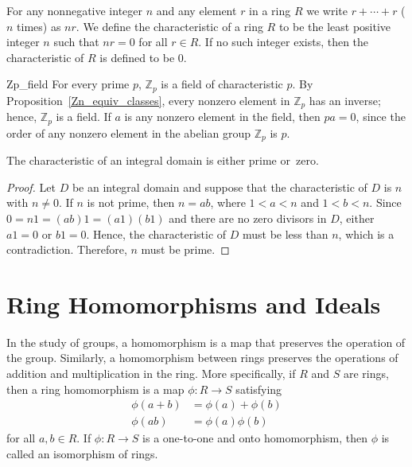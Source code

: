  
\medskip
 
 
For any nonnegative integer $n$ and any element $r$ in a ring $R$ we 
write $r + \cdots + r$ ($n$ times) as $nr$. We  define the {\bfi
characteristic\/}\label{ringchar} of a ring $R$ to 
be the least positive integer $n$ such that $nr=0$ for all $r \in R$.
If no such integer exists, then the characteristic of $R$ is defined
to be 0.  
 
 
\begin{example}{Zp_field}
For every prime $p$, ${\mathbb Z}_p$ is a field of characteristic $p$. By
Proposition~\ref{Zn_equiv_classes}, every nonzero element in ${\mathbb Z}_p$ has an inverse;
hence, ${\mathbb Z}_p$ is a field. If $a$ is any nonzero element in the
field, then $pa =0$, since the order of any nonzero element in the
abelian group ${\mathbb Z}_p$ is $p$. 
\end{example}
 
 
\begin{theorem}\label{rings:characteristic_theorem}
The characteristic of an integral domain is either prime or~zero.
\end{theorem}
 
 
\begin{proof}
Let $D$ be an integral domain and suppose that the characteristic of
$D$ is $n$ with $n \neq 0$. If $n$ is not prime, then $n = ab$, where
$1 < a <n$ and $1 < b < n$. Since $0 = n 1 = (ab)1 = (a1)(b1)$ and
there are no zero divisors in $D$, either $a1 =0$ or $b1=0$. Hence,
the characteristic of $D$ must be less than $n$, which is a
contradiction.  Therefore, $n$ must be prime. 
\end{proof}
 
 
 
\section{Ring Homomorphisms and Ideals}
 
 
In the study of groups, a homomorphism is a map that preserves the
operation of the group.  Similarly, a homomorphism between rings
preserves the operations of addition and multiplication in the ring.
More specifically, if  $R$ and $S$ are rings, then   a {\bfi ring
homomorphism\/} is a
map $\phi : R \rightarrow S$ satisfying  
\begin{align*}
\phi( a + b ) & = \phi( a ) + \phi(b) \\
\phi( a b ) & = \phi( a ) \phi(b)
\end{align*}
for all $a, b \in R$.  
If $\phi : R \rightarrow S$ is a one-to-one and onto homomorphism,
then $\phi$ is called an {\bfi
isomorphism\/} of rings.   
 

